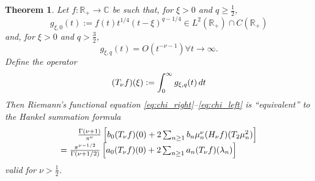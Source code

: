 \documentclass{article}
\newcommand{\assign}{:=}
\newtheorem{theorem}{Theorem}
\begin{document}
\begin{theorem}
  \label{thm:riemann_functional}Let $f : \mathbb{R}_+ \to \mathbb{C}$ be such
  that, for $\xi > 0$ and $q \geq \frac{1}{2}$,
  \begin{equation}
    g_{\xi, 0} (t) \assign f (t) t^{1 / 4}  (t - \xi)^{q - 1 / 4} \in L^2
    (\mathbb{R}_+) \cap C (\mathbb{R}_+) \label{eq:hankel_condition_1}
  \end{equation}
  and, for $\xi > 0$ and $q > \frac{3}{2}$,
  \begin{equation}
    g_{\xi, q} (t) = O (t^{- \nu - 1}) \forall t \to \infty .
    \label{eq:hankel_condition_2}
  \end{equation}
  Define the operator
  \begin{equation}
    (T_{\nu} f) (\xi) \assign \int_0^{\infty} g_{\xi, q} (t)  \hspace{0.17em}
    dt \label{eq:operator_definition}
  \end{equation}
  Then Riemann's functional equation \eqref{eq:chi_right}--\eqref{eq:chi_left}
  is ``equivalent'' to the Hankel summation formula
  \begin{equation}
    \begin{array}{l}
      \text{\qquad} \frac{\Gamma (\nu + 1)}{\pi^{\nu}}  \left[ b_0 (T_{\nu} f)
      (0) + 2 \sum_{n \geq 1} b_n \mu_n^{\nu} (H_{\nu} f) (T_2 \mu_n^2)
      \right]\\
      = \frac{\pi^{\nu - 1 / 2}}{\Gamma (\nu + 1 / 2)}  \left[ a_0 (T_{\nu} f)
      (0) + 2 \sum_{n \geq 1} a_n (T_{\nu} f) (\lambda_n) \right]
    \end{array} \label{eq:hankel_summation_formula}
  \end{equation}
  valid for $\nu > \frac{1}{2}$.
\end{theorem}
\end{document}
